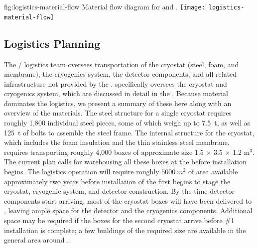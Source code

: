  
\begin{dunefigure}
{fig:logistics-material-flow}
  {Material flow diagram for  and . }
 \texttt{[image: logistics-material-flow]}
\end{dunefigure}

\subsection{Logistics Planning}
\label{sec:fdsp-tc-logPln}

The / logistics team oversees transportation of the cryostat (steel, foam, and membrane), the cryogenics system, the  detector components, and all related infrastructure not provided by the . 
 specifically oversees the cryostat and cryogenics system, which are  discussed in detail in the  . Because  material dominates the logistics, we present a summary of these here along with an overview of the  materials.  
The steel structure for a single  cryostat requires roughly 1,800 individual steel pieces,  some of which weigh up to \SI{7.5}{t}, as well as \SI{125}{t} of bolts to assemble the steel frame. 
The internal structure for the cryostat, which includes the foam insulation and the thin stainless steel membrane, requires transporting roughly 4,000 boxes of approximate size  1.5 $\times$ 3.5 $\times$ 1.2 m$^3$. 
 The current plan calls for warehousing all these boxes at the  before installation begins. 
The logistics operation will require roughly $\SI{5000}{m^2}$ of area available approximately two years before installation of the first  begins to stage the cryostat, cryogenic system, and detector construction. 
By the time detector components start arriving, most of the cryostat boxes will have been delivered to , leaving ample space for the detector and the cryogenics components. 
Additional space may be required if the boxes for the second cryostat arrive before   \#1 installation is complete; a few buildings of the required size are available in the general area around . 

